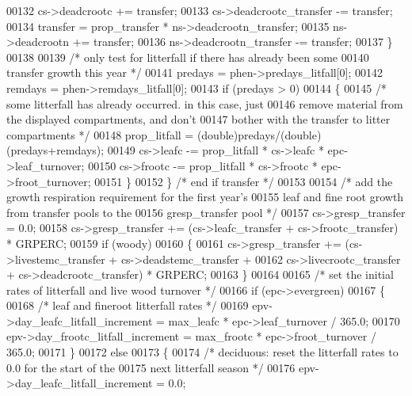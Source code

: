 \begin{DoxyCode}
00132             cs->deadcrootc          += transfer;
00133             cs->deadcrootc\_transfer -= transfer;
00134             transfer = prop\_transfer * ns->deadcrootn\_transfer;
00135             ns->deadcrootn          += transfer;
00136             ns->deadcrootn\_transfer -= transfer;
00137         \}
00138         
00139         \textcolor{comment}{/* only test for litterfall if there has already been some}
00140 \textcolor{comment}{        transfer growth this year */}
00141         predays = phen->predays\_litfall[0];
00142         remdays = phen->remdays\_litfall[0];
00143         \textcolor{keywordflow}{if} (predays > 0)
00144         \{
00145             \textcolor{comment}{/* some litterfall has already occurred. in this case, just}
00146 \textcolor{comment}{            remove material from the displayed compartments, and don't}
00147 \textcolor{comment}{            bother with the transfer to litter compartments */}
00148             prop\_litfall = (double)predays/(\textcolor{keywordtype}{double})(predays+remdays);
00149             cs->leafc  -= prop\_litfall * cs->leafc * epc->leaf\_turnover;
00150             cs->frootc -= prop\_litfall * cs->frootc * epc->froot\_turnover;
00151         \}
00152     \} \textcolor{comment}{/* end if transfer */}
00153 
00154     \textcolor{comment}{/* add the growth respiration requirement for the first year's}
00155 \textcolor{comment}{    leaf and fine root growth from transfer pools to the }
00156 \textcolor{comment}{    gresp\_transfer pool */}
00157     cs->gresp\_transfer = 0.0;
00158     cs->gresp\_transfer += (cs->leafc\_transfer + cs->frootc\_transfer) * GRPERC;
00159     \textcolor{keywordflow}{if} (woody)
00160     \{
00161         cs->gresp\_transfer += (cs->livestemc\_transfer + cs->deadstemc\_transfer +
00162             cs->livecrootc\_transfer + cs->deadcrootc\_transfer) * GRPERC;
00163     \}
00164     
00165     \textcolor{comment}{/* set the initial rates of litterfall and live wood turnover */}
00166     \textcolor{keywordflow}{if} (epc->evergreen)
00167     \{
00168         \textcolor{comment}{/* leaf and fineroot litterfall rates */}
00169         epv->day\_leafc\_litfall\_increment = max\_leafc * epc->leaf\_turnover / 365.0;
00170         epv->day\_frootc\_litfall\_increment = max\_frootc * epc->froot\_turnover / 365.0;
00171     \}
00172     \textcolor{keywordflow}{else}
00173     \{
00174         \textcolor{comment}{/* deciduous: reset the litterfall rates to 0.0 for the start of the}
00175 \textcolor{comment}{        next litterfall season */}
00176         epv->day\_leafc\_litfall\_increment = 0.0;

\end{DoxyCode}
